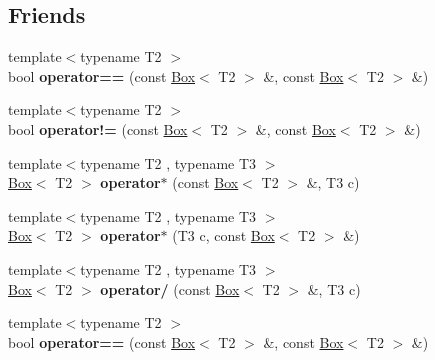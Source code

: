 \subsection*{Friends}
\begin{DoxyCompactItemize}
\item 
\hypertarget{class_box_a6039a2c9a493ae6ba38deb18fd9e6ab1}{
{\footnotesize template$<$typename T2 $>$ }\\bool {\bfseries operator==} (const \hyperlink{class_box}{Box}$<$ T2 $>$ \&, const \hyperlink{class_box}{Box}$<$ T2 $>$ \&)}
\label{class_box_a6039a2c9a493ae6ba38deb18fd9e6ab1}

\item 
\hypertarget{class_box_a5036b46321a1cf15710571b4f5e2a6e6}{
{\footnotesize template$<$typename T2 $>$ }\\bool {\bfseries operator!=} (const \hyperlink{class_box}{Box}$<$ T2 $>$ \&, const \hyperlink{class_box}{Box}$<$ T2 $>$ \&)}
\label{class_box_a5036b46321a1cf15710571b4f5e2a6e6}

\item 
\hypertarget{class_box_a9cc1a4474d25a4b472097480732acc93}{
{\footnotesize template$<$typename T2 , typename T3 $>$ }\\\hyperlink{class_box}{Box}$<$ T2 $>$ {\bfseries operator$\ast$} (const \hyperlink{class_box}{Box}$<$ T2 $>$ \&, T3 c)}
\label{class_box_a9cc1a4474d25a4b472097480732acc93}

\item 
\hypertarget{class_box_acb7a1088a3d15a5d0d515084854da7a6}{
{\footnotesize template$<$typename T2 , typename T3 $>$ }\\\hyperlink{class_box}{Box}$<$ T2 $>$ {\bfseries operator$\ast$} (T3 c, const \hyperlink{class_box}{Box}$<$ T2 $>$ \&)}
\label{class_box_acb7a1088a3d15a5d0d515084854da7a6}

\item 
\hypertarget{class_box_aa7ca8b98d5e0bee623683f0c8a70fda0}{
{\footnotesize template$<$typename T2 , typename T3 $>$ }\\\hyperlink{class_box}{Box}$<$ T2 $>$ {\bfseries operator/} (const \hyperlink{class_box}{Box}$<$ T2 $>$ \&, T3 c)}
\label{class_box_aa7ca8b98d5e0bee623683f0c8a70fda0}

\item 
\hypertarget{class_box_a6039a2c9a493ae6ba38deb18fd9e6ab1}{
{\footnotesize template$<$typename T2 $>$ }\\bool {\bfseries operator==} (const \hyperlink{class_box}{Box}$<$ T2 $>$ \&, const \hyperlink{class_box}{Box}$<$ T2 $>$ \&)}
\label{class_box_a6039a2c9a493ae6ba38deb18fd9e6ab1}


\end{DoxyCompactItemize}
